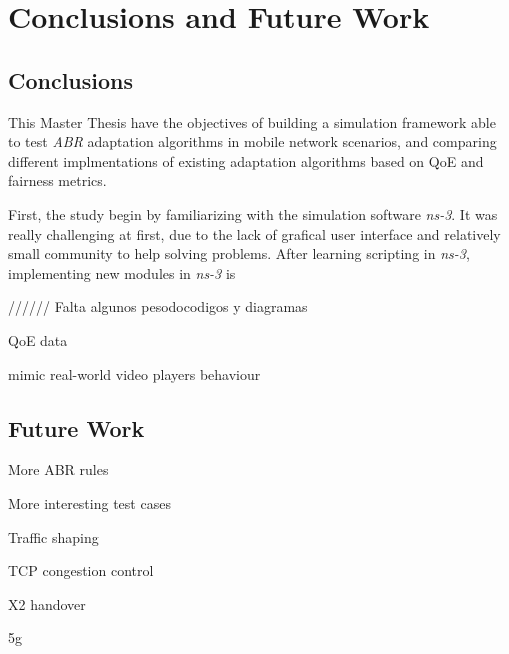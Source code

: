 \chapter{Conclusions and Future Work}
\label{chap:conclusions}

\section{Conclusions}

This Master Thesis have the objectives of building a simulation framework
able to test \textit{ABR} adaptation algorithms in mobile network scenarios,
and comparing different implmentations of existing adaptation algorithms 
based on QoE and fairness metrics.

First, the study begin by familiarizing with the simulation software \textit{ns-3}.
It was really challenging at first, due to the lack of grafical user interface
and relatively small community to help solving problems. After learning scripting
in \textit{ns-3}, implementing new modules in \textit{ns-3} is


////// Falta algunos pesodocodigos y diagramas 

QoE data 

mimic real-world video players behaviour


\section{Future Work}

More ABR rules


More interesting test cases 


Traffic shaping


TCP congestion control


X2 handover


5g